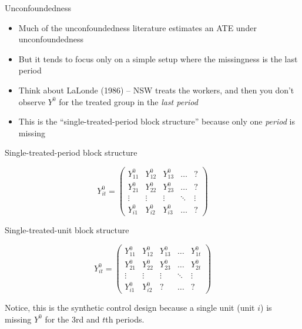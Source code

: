 \documentclass{beamer}
\begin{document}
\begin{frame}{Unconfoundedness}

\begin{itemize}
\item Much of the unconfoundedness literature estimates an ATE under unconfoundedness 
\item But it tends to focus only on a simple setup where the missingness is the last period
\item Think about LaLonde (1986) -- NSW treats the workers, and then you don't observe $Y^0$ for the treated group in the \emph{last period}
\item This is the ``single-treated-period block structure'' because only one \emph{period} is missing
\end{itemize}

\end{frame}

\begin{frame}{Single-treated-period block structure}

\begin{center}
\[ Y^0_{it}  =\begin{pmatrix}
    Y^0_{11} & Y^0_{12} & Y^0_{13} & \dots  & ? \\
    Y^0_{21} & Y^0_{22} & Y^0_{23} & \dots  & ? \\
    \vdots & \vdots & \vdots & \ddots & \vdots \\
    Y^0_{i1} & Y^0_{i2} & Y^0_{i3} & \dots  & ?
\end{pmatrix}\]
\end{center}

\end{frame}


\begin{frame}{Single-treated-unit block structure}

\begin{center}
\[ Y^0_{it}  =\begin{pmatrix}
    Y^0_{11} & Y^0_{12} & Y^0_{13} & \dots  & Y^0_{1t} \\
    Y^0_{21} & Y^0_{22} & Y^0_{23} & \dots  & Y^0_{2t}  \\
    \vdots & \vdots & \vdots & \ddots & \vdots \\
    Y^0_{i1} & Y^0_{i2} & ? & \dots  & ?
\end{pmatrix}\]
\end{center}

Notice, this is the synthetic control design because a single unit (unit $i$) is missing $Y^0$ for the 3rd and $t$th periods.

\end{frame}
\end{document}
